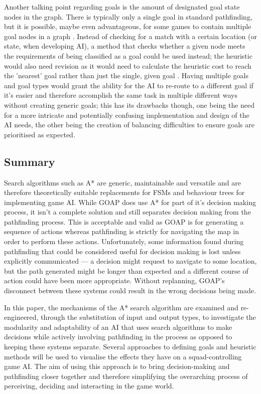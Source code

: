 \documentclass[11pt, a4paper]{report}
\begin{document}
Another talking point regarding goals is the amount of designated goal state nodes in the graph. There is typically only a single goal in standard pathfinding, but it is possible, maybe even advantageous, for some games to contain multiple goal nodes in a graph \parencite[272]{millington2019ai}. Instead of checking for a match with a certain location (or state, when developing AI), a method that checks whether a given node meets the requirements of being classified as a goal could be used instead; the heuristic would also need revision as it would need to calculate the heuristic cost to reach the 'nearest' goal rather than just the single, given goal \parencite[272]{millington2019ai}. Having multiple goals and goal types \parencite[121]{higgins2002generic} would grant the ability for the AI to re-route to a different goal if it's easier and therefore accomplish the same task in multiple different ways without creating generic goals; this has its drawbacks though, one being the need for a more intricate and potentially confusing implementation and design of the AI needs, the other being the creation of balancing difficulties to ensure goals are prioritised as expected.

\subsection{Summary}
\label{subsec:litReviewSummary}

Search algorithms such as A* are generic, maintainable and versatile and are therefore theoretically suitable replacements for FSMs and behaviour trees for implementing game AI. While GOAP does use A* for part of it's decision making process, it isn't a complete solution and still separates decision making from the pathfinding process. This is acceptable and valid as GOAP is for generating a sequence of actions whereas pathfinding is strictly for navigating the map in order to perform these actions. Unfortunately, some information found during pathfinding that could be considered useful for decision making is lost unless explicitly communicated --- a decision might request to navigate to some location, but the path generated might be longer than expected and a different course of action could have been more appropriate. Without replanning, GOAP's disconnect between these systems could result in the wrong decisions being made.

In this paper, the mechanisms of the A* search algorithm are examined and re-engineered, through the substitution of input and output types, to investigate the modularity and adaptability of an AI that uses search algorithms to make decisions while actively involving pathfinding in the process as opposed to keeping these systems separate. Several approaches to defining goals and heuristic methods will be used to visualise the effects they have on a squad-controlling game AI. The aim of using this approach is to bring decision-making and pathfinding closer together and therefore simplifying the overarching process of perceiving, deciding and interacting in the game world.
\end{document}
